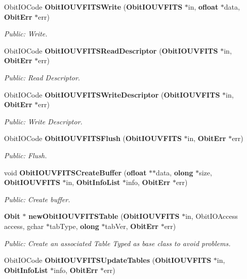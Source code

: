 \begin{CompactItemize}
Obit\-IOCode {\bf Obit\-IOUVFITSWrite} ({\bf Obit\-IOUVFITS} $\ast$in, {\bf ofloat} $\ast$data, {\bf Obit\-Err} $\ast$err)
\begin{CompactList}\small\item\em Public: Write. \item\end{CompactList}\item 
Obit\-IOCode {\bf Obit\-IOUVFITSRead\-Descriptor} ({\bf Obit\-IOUVFITS} $\ast$in, {\bf Obit\-Err} $\ast$err)
\begin{CompactList}\small\item\em Public: Read Descriptor. \item\end{CompactList}\item 
Obit\-IOCode {\bf Obit\-IOUVFITSWrite\-Descriptor} ({\bf Obit\-IOUVFITS} $\ast$in, {\bf Obit\-Err} $\ast$err)
\begin{CompactList}\small\item\em Public: Write Descriptor. \item\end{CompactList}\item 
Obit\-IOCode {\bf Obit\-IOUVFITSFlush} ({\bf Obit\-IOUVFITS} $\ast$in, {\bf Obit\-Err} $\ast$err)
\begin{CompactList}\small\item\em Public: Flush. \item\end{CompactList}\item 
void {\bf Obit\-IOUVFITSCreate\-Buffer} ({\bf ofloat} $\ast$$\ast$data, {\bf olong} $\ast$size, {\bf Obit\-IOUVFITS} $\ast$in, {\bf Obit\-Info\-List} $\ast$info, {\bf Obit\-Err} $\ast$err)
\begin{CompactList}\small\item\em Public: Create buffer. \item\end{CompactList}\item 
{\bf Obit} $\ast$ {\bf new\-Obit\-IOUVFITSTable} ({\bf Obit\-IOUVFITS} $\ast$in, Obit\-IOAccess access, gchar $\ast$tab\-Type, {\bf olong} $\ast$tab\-Ver, {\bf Obit\-Err} $\ast$err)
\begin{CompactList}\small\item\em Public: Create an associated Table Typed as base class to avoid problems. \item\end{CompactList}\item 
Obit\-IOCode {\bf Obit\-IOUVFITSUpdate\-Tables} ({\bf Obit\-IOUVFITS} $\ast$in, {\bf Obit\-Info\-List} $\ast$info, {\bf Obit\-Err} $\ast$err)
$$
\end{CompactItemize}
